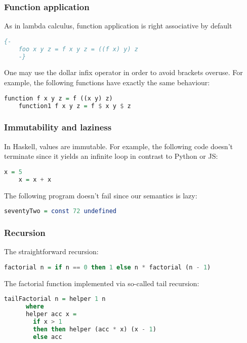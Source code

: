 \documentclass[10pt,pdf,utf8,russian,aspectratio=169]{beamer}
\begin{document}
\begin{frame}[fragile]
  \frametitle{Function application}

  As in lambda calculus, function application is right associative by default

  \begin{lstlisting}[language=Haskell]
    {-
    foo x y z = f x y z = ((f x) y) z
    -}
  \end{lstlisting}

\vspace{\baselineskip}

  One may use the dollar infix operator in order to avoid brackets overuse. For example, the following functions have exactly the same behaviour:

  \begin{lstlisting}[language=Haskell]
    function f x y z = f ((x y) z)
    function1 f x y z = f $ x y $ z
  \end{lstlisting}
\end{frame}

\begin{frame}[fragile]
  \frametitle{Immutability and laziness}

In Haskell, values are immutable. For example, the following code doesn't terminate since it yields an infinite loop in contrast to Python or JS:

  \begin{lstlisting}[language=Haskell]
    x = 5
    x = x + x
  \end{lstlisting}

\vspace{\baselineskip}

The following program doesn't fail since our semantics is lazy:

  \begin{lstlisting}[language=Haskell]
    seventyTwo = const 72 undefined
  \end{lstlisting}
\end{frame}

\begin{frame}[fragile]
  \frametitle{Recursion}

  The straightforward recursion:
  \begin{lstlisting}[language=Haskell]
    factorial n = if n == 0 then 1 else n * factorial (n - 1)
  \end{lstlisting}

  \vspace{\baselineskip}

  The factorial function implemented via so-called tail recursion:
  \begin{lstlisting}[language=Haskell]
    tailFactorial n = helper 1 n
      where
      helper acc x =
        if x > 1
        then then helper (acc * x) (x - 1)
        else acc
  \end{lstlisting}
\end{frame}
\end{document}
